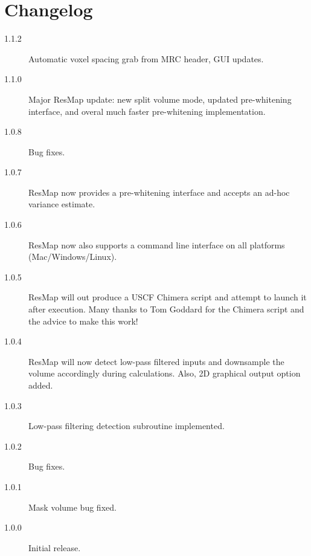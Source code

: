 \documentclass[10pt]{article}
\begin{document}
\section{Changelog}
\begin{description}
	\item[1.1.2] Automatic voxel spacing grab from MRC header, GUI updates.
	\item[1.1.0] Major ResMap update: new split volume mode, updated pre-whitening interface, and overal much faster pre-whitening implementation.
	\item[1.0.8] Bug fixes.
	\item[1.0.7] ResMap now provides a pre-whitening interface and accepts an ad-hoc variance estimate.
	\item[1.0.6] ResMap now also supports a command line interface on all platforms (Mac/Windows/Linux).
	\item[1.0.5] ResMap will out produce a USCF Chimera script and attempt to launch it after execution. Many thanks to Tom Goddard for the Chimera script and the advice to make this work!
	\item[1.0.4] ResMap will now detect low-pass filtered inputs and downsample the volume accordingly during calculations. Also, 2D graphical output option added.
	\item[1.0.3] Low-pass filtering detection subroutine implemented.
	\item[1.0.2] Bug fixes.
	\item[1.0.1] Mask volume bug fixed.
	\item[1.0.0] Initial release.
\end{description}
\end{document}
